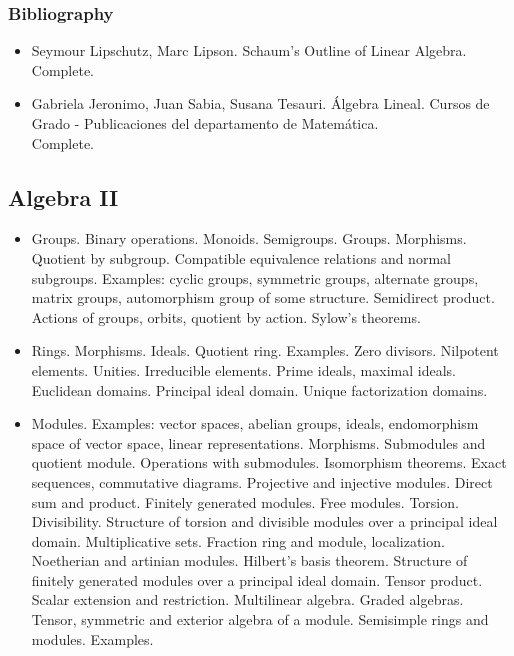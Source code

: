 \documentclass[spanish]{article}
\begin{document}
\subsubsection{Bibliography}
\begin{itemize}
  \item
Seymour Lipschutz, Marc Lipson. Schaum's Outline of Linear Algebra.\\
Complete.

  \item
Gabriela Jeronimo, Juan Sabia, Susana Tesauri. \'Algebra Lineal.
Cursos de Grado - Publicaciones del departamento de Matem\'atica.\\
Complete.
\end{itemize}


\hrulefill%


\subsection{Algebra II}


\begin{itemize}
  \item
Groups.
Binary operations. Monoids. Semigroups. Groups. Morphisms. Quotient by subgroup.
Compatible equivalence relations and normal subgroups. Examples: cyclic groups,
symmetric groups, alternate groups, matrix groups, automorphism group of some
structure. Semidirect product. Actions of groups, orbits, quotient by action.
Sylow's theorems.


  \item
Rings.
Morphisms. Ideals. Quotient ring. Examples. Zero divisors. Nilpotent elements.
Unities. Irreducible elements. Prime ideals, maximal ideals. Euclidean domains.
Principal ideal domain. Unique factorization domains.


  \item
Modules.
Examples: vector spaces, abelian groups, ideals, endomorphism space of vector space,
linear representations. Morphisms. Submodules and quotient module. Operations
with submodules. Isomorphism theorems. Exact sequences, commutative diagrams.
Projective and injective modules.
Direct sum and product. Finitely generated modules. Free modules. Torsion. Divisibility.
Structure of torsion and divisible modules over a principal ideal domain. Multiplicative
sets. Fraction ring and module, localization. Noetherian and artinian modules.
Hilbert's basis theorem. Structure of finitely generated modules over a principal
ideal domain. Tensor product. Scalar extension and restriction. Multilinear algebra.
Graded algebras. Tensor, symmetric and exterior algebra of a module.
Semisimple rings and modules. Examples.

\end{itemize}
\end{document}
